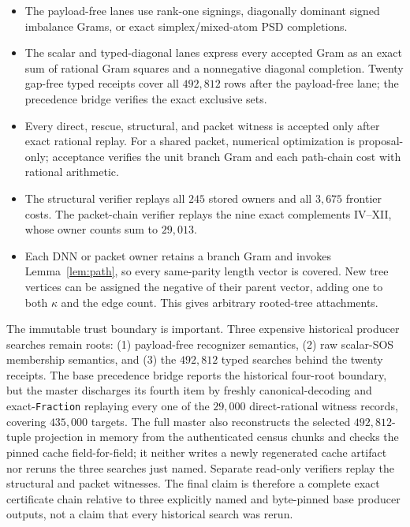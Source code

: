 \documentclass[11pt]{article}
\theoremstyle{remark}
\newcommand{\kappad}{\kappa}
\begin{document}
\begin{itemize}
\item The payload-free lanes use rank-one signings, diagonally dominant signed
imbalance Grams, or exact simplex/mixed-atom PSD completions.
\item The scalar and typed-diagonal lanes express every accepted Gram as an
exact sum of rational Gram squares and a nonnegative diagonal completion.
Twenty gap-free typed receipts cover all $492{,}812$ rows after the
payload-free lane; the precedence bridge verifies the exact exclusive sets.
\item Every direct, rescue, structural, and packet witness is accepted only
after exact rational replay.  For a shared packet, numerical optimization is
proposal-only; acceptance verifies the unit branch Gram and each path-chain
cost with rational arithmetic.
\item The structural verifier replays all $245$ stored owners and all
$3{,}675$ frontier costs.  The packet-chain verifier replays the nine exact
complements IV--XII, whose owner counts sum to $29{,}013$.
\item Each DNN or packet owner retains a branch Gram and invokes
Lemma~\ref{lem:path}, so every same-parity length vector is covered.  New tree
vertices can be assigned the negative of their parent vector, adding one to
both $\kappad$ and the edge count.  This gives arbitrary rooted-tree
attachments.
\end{itemize}

The immutable trust boundary is important.  Three expensive historical
producer searches remain roots: (1) payload-free recognizer semantics, (2) raw
scalar-SOS membership semantics, and (3) the $492{,}812$ typed searches behind
the twenty receipts.  The base precedence bridge reports the historical
four-root boundary, but the master discharges its fourth item by freshly
canonical-decoding and exact-\texttt{Fraction} replaying every one of the
$29{,}000$ direct-rational witness records, covering $435{,}000$ targets.  The
full master also reconstructs the selected $492{,}812$-tuple projection in
memory from the authenticated census chunks and checks the pinned cache
field-for-field; it neither writes a newly regenerated cache artifact nor
reruns the three searches just named.  Separate read-only verifiers replay the
structural and packet witnesses.  The final claim is therefore a complete
exact certificate chain relative to three explicitly named and byte-pinned
base producer outputs, not a claim that every historical search was rerun.
\end{document}
